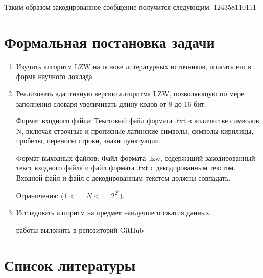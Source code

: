 \documentclass[a4paper]{article}
\begin{document}
Таким образом закодированное сообщение получится следующим:
124358110111

\newpage
\section{Формальная постановка задачи}
\begin{enumerate}
\item Изучить алгоритм LZW на основе литературных источников, описать его в форме научного доклада. 

\item Реализовать адаптивную версию алгоритма LZW, позволяющую по мере заполнения словаря увеличивать длину кодов от 8 до 16 бит. 

Формат входного файла:
Текстовый файл формата .txt в количестве символов N, включая строчные и прописные латинские символы, символы кирилицы, пробелы, переносы строки, знаки пунктуации. 

Формат выходных файлов:
Файл формата .lzw, содержащий закодированный текст входного файла и файл формата .txt с декодированным текстом. Входной файл и файл с декодированным текстом должны совпадать.

Ограничения:
($1<=N<=2^2^0$).

\item Исследовать алгоритм на предмет наилучшего сжатия данных.

 работы выложить в репозиторий GitHub
\end{enumerate}
\newpage

\newpage
\section{Список литературы}
\end{document}
